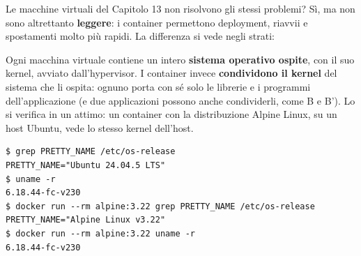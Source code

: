 Le macchine virtuali del Capitolo 13 non risolvono gli stessi problemi? Sì, ma non sono altrettanto
\textbf{leggere}: i container permettono deployment, riavvii e spostamenti molto più rapidi. La differenza si vede
negli strati:

\begin{center}
\end{center}

Ogni macchina virtuale contiene un intero \textbf{sistema operativo ospite}, con il suo kernel, avviato
dall'hypervisor. I container invece \textbf{condividono il kernel} del sistema che li ospita: ognuno porta con sé solo
le librerie e i programmi dell'applicazione (e due applicazioni possono anche condividerli, come B e B'). Lo si verifica
in un attimo: un container con la distribuzione Alpine Linux, su un host Ubuntu, vede lo stesso kernel dell'host.

\begin{lstlisting}[style=shell, name=Terminale]
$ grep PRETTY_NAME /etc/os-release
PRETTY_NAME="Ubuntu 24.04.5 LTS"
$ uname -r
6.18.44-fc-v230
$ docker run --rm alpine:3.22 grep PRETTY_NAME /etc/os-release
PRETTY_NAME="Alpine Linux v3.22"
$ docker run --rm alpine:3.22 uname -r
6.18.44-fc-v230
\end{lstlisting}

